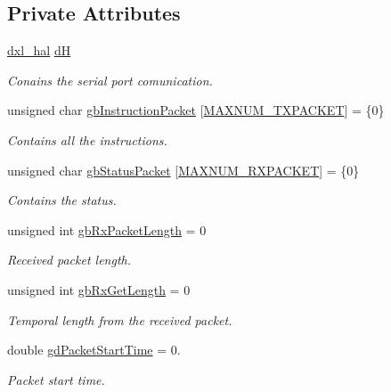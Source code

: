 \subsection*{Private Attributes}
\begin{DoxyCompactItemize}
\item 
\hyperlink{classdxl__hal}{dxl\+\_\+hal} \hyperlink{classdynamixel_ae003cc90ada6d7b70eaa4ea9d42d4deb}{d\+H}
\begin{DoxyCompactList}\small\item\em Conains the serial port comunication. \end{DoxyCompactList}\item 
unsigned char \hyperlink{classdynamixel_afd94dcf01b8e96298727776e222de722}{gb\+Instruction\+Packet} \mbox{[}\hyperlink{dxl__hal_8h_ad753363487043da5d9fdd3fd1071f59e}{M\+A\+X\+N\+U\+M\+\_\+\+T\+X\+P\+A\+C\+K\+E\+T}\mbox{]} = \{0\}
\begin{DoxyCompactList}\small\item\em Contains all the instructions. \end{DoxyCompactList}\item 
unsigned char \hyperlink{classdynamixel_aa57c86d3bbbeaf5c9d4f6bd00376b04f}{gb\+Status\+Packet} \mbox{[}\hyperlink{dxl__hal_8h_a37d5ce8f0a9ee058fa9674502c6a8b3a}{M\+A\+X\+N\+U\+M\+\_\+\+R\+X\+P\+A\+C\+K\+E\+T}\mbox{]} = \{0\}
\begin{DoxyCompactList}\small\item\em Contains the status. \end{DoxyCompactList}\item 
unsigned int \hyperlink{classdynamixel_a333686e1b5903d16c41df8172b6bd5a8}{gb\+Rx\+Packet\+Length} = 0
\begin{DoxyCompactList}\small\item\em Received packet length. \end{DoxyCompactList}\item 
unsigned int \hyperlink{classdynamixel_a9d590ce24791d111c2db9b66be1e046d}{gb\+Rx\+Get\+Length} = 0
\begin{DoxyCompactList}\small\item\em Temporal length from the received packet. \end{DoxyCompactList}\item 
double \hyperlink{classdynamixel_a6c6314fb7070e6fd361e57c5de17e0ec}{gd\+Packet\+Start\+Time} = 0.
\begin{DoxyCompactList}\small\item\em Packet start time. \end{DoxyCompactList}\item 

\end{DoxyCompactItemize}
